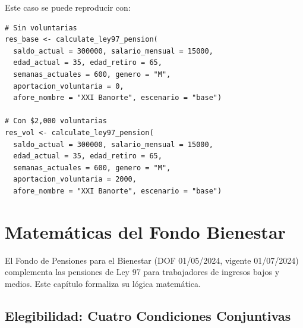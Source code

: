 \documentclass[11pt,a4paper]{report}
\theoremstyle{remark}
\begin{document}
\begin{tcolorbox}[colback=orange!5!white, colframe=orange!75!black, title=\textbf{Aplicaci\'on en C\'odigo}]
Este caso se puede reproducir con:
\begin{lstlisting}
# Sin voluntarias
res_base <- calculate_ley97_pension(
  saldo_actual = 300000, salario_mensual = 15000,
  edad_actual = 35, edad_retiro = 65,
  semanas_actuales = 600, genero = "M",
  aportacion_voluntaria = 0,
  afore_nombre = "XXI Banorte", escenario = "base")

# Con $2,000 voluntarias
res_vol <- calculate_ley97_pension(
  saldo_actual = 300000, salario_mensual = 15000,
  edad_actual = 35, edad_retiro = 65,
  semanas_actuales = 600, genero = "M",
  aportacion_voluntaria = 2000,
  afore_nombre = "XXI Banorte", escenario = "base")
\end{lstlisting}
\end{tcolorbox}


\chapter{Matem\'aticas del Fondo Bienestar}

El Fondo de Pensiones para el Bienestar (DOF 01/05/2024, vigente 01/07/2024) complementa las pensiones de Ley 97 para trabajadores de ingresos bajos y medios. Este cap\'itulo formaliza su l\'ogica matem\'atica.

\section{Elegibilidad: Cuatro Condiciones Conjuntivas}
\end{document}
